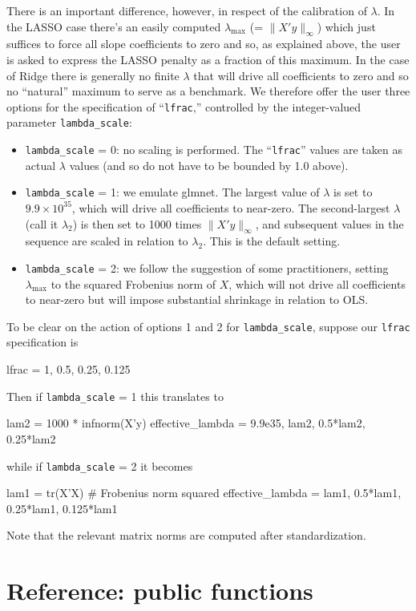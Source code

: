 \documentclass{article}
\begin{document}
There is an important difference, however, in respect of the
calibration of $\lambda$. In the LASSO case there's an easily computed
$\lambda_{\max}$ (= $\|X'y\|_{\infty}$) which just suffices to force
all slope coefficients to zero and so, as explained above, the user is
asked to express the LASSO penalty as a fraction of this maximum. In
the case of Ridge there is generally no finite $\lambda$ that will
drive all coefficients to zero and so no ``natural'' maximum to serve
as a benchmark. We therefore offer the user three options for the
specification of ``\texttt{lfrac},'' controlled by the integer-valued
parameter \texttt{lambda\_scale}:
\begin{itemize}
\item \texttt{lambda\_scale} = 0: no scaling is performed. The
  ``\texttt{lfrac}'' values are taken as actual $\lambda$ values (and
  so do not have to be bounded by 1.0 above).
\item \texttt{lambda\_scale} = 1: we emulate \textsf{glmnet}. The
  largest value of $\lambda$ is set to $9.9 \times 10^{35}$, which
  will drive all coefficients to near-zero. The second-largest
  $\lambda$ (call it $\lambda_2$) is then set to 1000 times
  $\|X'y\|_{\infty}$, and subsequent values in the sequence are scaled
  in relation to $\lambda_2$. This is the default setting.
\item \texttt{lambda\_scale} = 2: we follow the suggestion of some
  practitioners, setting $\lambda_{\max}$ to the squared Frobenius
  norm of $X$, which will not drive all coefficients to near-zero but
  will impose substantial shrinkage in relation to OLS.
\end{itemize}

To be clear on the action of options 1 and 2 for
\texttt{lambda\_scale}, suppose our \texttt{lfrac} specification is
\begin{code}
lfrac = {1, 0.5, 0.25, 0.125}
\end{code}
Then if \texttt{lambda\_scale} = 1 this translates to
\begin{code}
lam2 = 1000 * infnorm(X'y)
effective_lambda = {9.9e35, lam2, 0.5*lam2, 0.25*lam2}
\end{code}
while if \texttt{lambda\_scale} = 2 it becomes
\begin{code}
lam1 = tr(X'X) # Frobenius norm squared
effective_lambda = {lam1, 0.5*lam1, 0.25*lam1, 0.125*lam1}
\end{code}
Note that the relevant matrix norms are computed after standardization.


\section{Reference: public functions}
\end{document}
